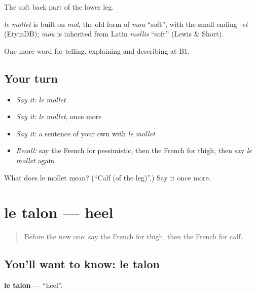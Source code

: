 The soft back part of the lower leg.

\begin{cousinweb}
\emph{le mollet} is built on \emph{mol}, the old form of \emph{mou} \textquotedblleft{}soft\textquotedblright{}, with the small ending \emph{-et} (EtymDB); \emph{mou} is inherited from Latin \emph{mollis} \textquotedblleft{}soft\textquotedblright{} (Lewis \& Short).
\end{cousinweb}

\begin{grammarlens}[title={What you've built}]
One more word for telling, explaining and describing at B1.
\end{grammarlens}

\subsection*{Your turn}
\begin{itemize}
\raggedright
  \item \emph{Say it:} \emph{le mollet}
  \item \emph{Say it:} \emph{le mollet}, once more
  \item \emph{Say it:} a sentence of your own with \emph{le mollet}
  \item \emph{Recall:} say the French for pessimistic, then the French for thigh, then say \emph{le mollet} again
\end{itemize}

\begin{tcolorbox}[breakable,colback=teal!4,colframe=teal!35!black,title={Before you move on}]
What does le mollet mean? (\textquotedblleft{}Calf (of the leg)\textquotedblright{}.) Say it once more.
\end{tcolorbox}
\section[le talon]{le talon — heel}

\label{lesson:FR-C477-talon}



\begin{quote}
Before the new one: say the French for thigh, then the French for calf.
\end{quote}

\subsection*{You'll want to know: le talon}
\textbf{le talon} — \textquotedblleft{}heel\textquotedblright{}.

